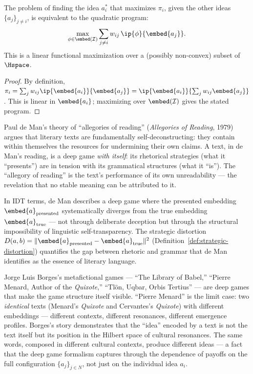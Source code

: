 \begin{theorem}
\label{thm:deep-quadratic}
The problem of finding the idea $a_i^*$ that maximizes $\pi_i$, given the
other ideas $\{a_j\}_{j \neq i}$, is equivalent to the quadratic program:
\[
  \max_{\phi \in \embed(\IS)} \sum_{j \neq i} w_{ij}\,
  \ip{\phi}{\embed{a_j}}.
\]
This is a linear functional maximization over a (possibly non-convex) subset
of $\Hspace$.
\end{theorem}

\begin{proof}
By definition, $\pi_i = \sum_{j} w_{ij} \ip{\embed{a_i}}{\embed{a_j}}
= \ip{\embed{a_i}}{\sum_{j} w_{ij} \embed{a_j}}$.  This is linear in
$\embed{a_i}$; maximizing over $\embed(\IS)$ gives the stated program.
\end{proof}

\begin{interpretation}
\label{interp:ch20:de_man_borges}
Paul de Man's theory of ``allegories of reading'' (\textit{Allegories of
Reading}, 1979) argues that literary texts are fundamentally
self-deconstructing: they contain within themselves the resources for
undermining their own claims.  A text, in de Man's reading, is a deep game
\emph{with itself}: its rhetorical strategies (what it ``presents'')
are in tension with its grammatical structures (what it ``is'').  The
``allegory of reading'' is the text's performance of its own
unreadability --- the revelation that no stable meaning can be attributed
to it.

In IDT terms, de Man describes a deep game where the presented embedding
$\embed{a}_{\text{presented}}$ systematically diverges from the true
embedding $\embed{a}_{\text{true}}$ --- not through deliberate deception
but through the structural impossibility of linguistic self-transparency.
The strategic distortion $D(a,b) = \|\embed{a}_{\text{presented}} -
\embed{a}_{\text{true}}\|^2$ (Definition~\ref{def:strategic-distortion})
quantifies the gap between rhetoric and grammar that de Man identifies
as the essence of literary language.

Jorge Luis Borges's metafictional games --- ``The Library of Babel,''
``Pierre Menard, Author of the \textit{Quixote},'' ``Tl\"on, Uqbar,
Orbis Tertius'' --- are deep games that make the game structure itself
visible.  ``Pierre Menard'' is the limit case: two \emph{identical}
texts (Menard's \textit{Quixote} and Cervantes's \textit{Quixote}) with
different embeddings --- different contexts, different resonances,
different emergence profiles.  Borges's story demonstrates that the
``idea'' encoded by a text is not the text itself but its position
in the Hilbert space of cultural resonances.  The same words, composed
in different cultural contexts, produce different ideas --- a fact
that the deep game formalism captures through the dependence of
payoffs on the full configuration $\{a_j\}_{j \in N}$, not just on
the individual idea $a_i$.
\end{interpretation}


